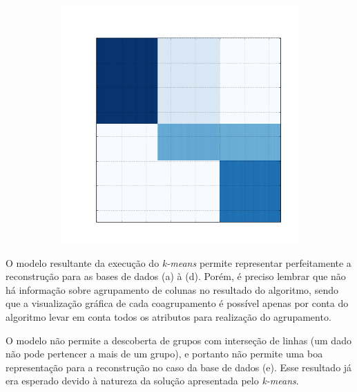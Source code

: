 \documentclass[
    12pt,                %
    oneside,            %
    a4paper,            %
    english,            %
    brazil                %
    ]{abntex2ppgsi}
\begin{document}
\begin{figure}[H]
\begin{subfigure}[b]{0.18\textwidth}
        \caption{}
    \end{subfigure}
    \begin{subfigure}[b]{0.18\textwidth}
        \includegraphics[width=\textwidth]{img/e-reconstruction-kmeans.png}
        \caption{}
    \end{subfigure}
    \label{fig:reconstruction:kmeans}
\end{figure}


O modelo resultante da execução do \textit{k-means} permite representar perfeitamente a reconstrução para as bases de dados (a) à (d).
Porém, é preciso lembrar que não há informação sobre agrupamento de colunas no resultado do algoritmo, sendo que a visualização gráfica de cada coagrupamento é possível apenas por conta do algoritmo levar em conta todos os atributos para realização do agrupamento.

O modelo não permite a descoberta de grupos com interseção de linhas (um dado não pode pertencer a mais de um grupo), e portanto não permite uma boa representação para a reconstrução no caso da base de dados (e).
Esse resultado já era esperado devido à natureza da solução apresentada pelo \textit{k-means}.
\end{document}

